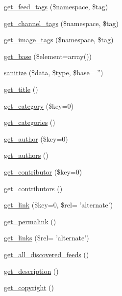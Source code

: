 \begin{DoxyCompactItemize}
\item 
\hyperlink{class_simple_pie_a31e2cb6bdaa3e8742bfb06c523b62cb7}{get\-\_\-feed\-\_\-tags} (\$namespace, \$tag)
\item 
\hyperlink{class_simple_pie_a65096224f3f77adc3010794f7168bfab}{get\-\_\-channel\-\_\-tags} (\$namespace, \$tag)
\item 
\hyperlink{class_simple_pie_a3d2c71fa6fc3ffbebb94172f9f75d51e}{get\-\_\-image\-\_\-tags} (\$namespace, \$tag)
\item 
\hyperlink{class_simple_pie_a662d026555d4755a1b7968d5f46dd5e8}{get\-\_\-base} (\$element=array())
\item 
\hyperlink{class_simple_pie_aa96d337894e72de4f4621e938d155638}{sanitize} (\$data, \$type, \$base= '')
\item 
\hyperlink{class_simple_pie_a6f3c25ea5e0549f995258e89ebe39f38}{get\-\_\-title} ()
\item 
\hyperlink{class_simple_pie_a8b5b71454b4f928aa51b37dee53975ab}{get\-\_\-category} (\$key=0)
\item 
\hyperlink{class_simple_pie_a70c7ae7a211183082c8b396463729cf8}{get\-\_\-categories} ()
\item 
\hyperlink{class_simple_pie_a3080144364c434992ec20921cd8cf9e0}{get\-\_\-author} (\$key=0)
\item 
\hyperlink{class_simple_pie_a0fd1019c95953d5c42944c8b7a77cb2c}{get\-\_\-authors} ()
\item 
\hyperlink{class_simple_pie_a1e763bb232d68be7237fd3d4f0e6fde2}{get\-\_\-contributor} (\$key=0)
\item 
\hyperlink{class_simple_pie_a07fb4be66a366963abbf8e41bb43b3b0}{get\-\_\-contributors} ()
\item 
\hyperlink{class_simple_pie_a8e44cd93067c08c26da4e18175a0e814}{get\-\_\-link} (\$key=0, \$rel= 'alternate')
\item 
\hyperlink{class_simple_pie_a4827b9bea7981ffc94299e428a25b1a6}{get\-\_\-permalink} ()
\item 
\hyperlink{class_simple_pie_a89bc7ca1fa51e94bcb2a73baf0a884d6}{get\-\_\-links} (\$rel= 'alternate')
\item 
\hyperlink{class_simple_pie_a5d4c0fc0220a3319f62c2056b771ed49}{get\-\_\-all\-\_\-discovered\-\_\-feeds} ()
\item 
\hyperlink{class_simple_pie_adb9323044091d25efe06f1175ad02658}{get\-\_\-description} ()
\item 
\hyperlink{class_simple_pie_ac032a66fa4eda4057baa2c6cdc074ce3}{get\-\_\-copyright} ()
\item 

\end{DoxyCompactItemize}
